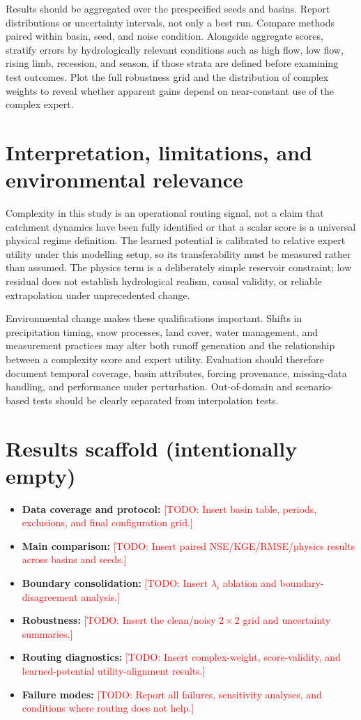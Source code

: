 \documentclass[11pt]{article}
\newcommand{\TODO}[1]{\textcolor{red}{[TODO: #1]}}
\begin{document}
Results should be aggregated over the prespecified seeds and basins. Report distributions or uncertainty intervals, not only a best run. Compare methods paired within basin, seed, and noise condition. Alongside aggregate scores, stratify errors by hydrologically relevant conditions such as high flow, low flow, rising limb, recession, and season, if those strata are defined before examining test outcomes. Plot the full robustness grid and the distribution of complex weights to reveal whether apparent gains depend on near-constant use of the complex expert.

\section{Interpretation, limitations, and environmental relevance}
Complexity in this study is an operational routing signal, not a claim that catchment dynamics have been fully identified or that a scalar score is a universal physical regime definition. The learned potential is calibrated to relative expert utility under this modelling setup, so its transferability must be measured rather than assumed. The physics term is a deliberately simple reservoir constraint; low residual does not establish hydrological realism, causal validity, or reliable extrapolation under unprecedented change.

Environmental change makes these qualifications important. Shifts in precipitation timing, snow processes, land cover, water management, and measurement practices may alter both runoff generation and the relationship between a complexity score and expert utility. Evaluation should therefore document temporal coverage, basin attributes, forcing provenance, missing-data handling, and performance under perturbation. Out-of-domain and scenario-based tests should be clearly separated from interpolation tests.

\section{Results scaffold (intentionally empty)}
\begin{itemize}[leftmargin=*]
  \item \textbf{Data coverage and protocol:} \TODO{Insert basin table, periods, exclusions, and final configuration grid.}
  \item \textbf{Main comparison:} \TODO{Insert paired NSE/KGE/RMSE/physics results across basins and seeds.}
  \item \textbf{Boundary consolidation:} \TODO{Insert $\lambda_i$ ablation and boundary-disagreement analysis.}
  \item \textbf{Robustness:} \TODO{Insert the clean/noisy $2\times2$ grid and uncertainty summaries.}
  \item \textbf{Routing diagnostics:} \TODO{Insert complex-weight, score-validity, and learned-potential utility-alignment results.}
  \item \textbf{Failure modes:} \TODO{Report all failures, sensitivity analyses, and conditions where routing does not help.}
\end{itemize}
\end{document}
